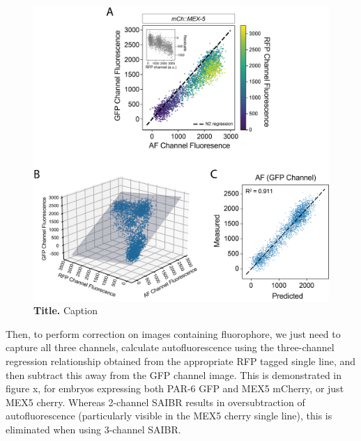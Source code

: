 \documentclass[12pt]{"article"}
\newcommand{\mycaption}[2]{\caption[#1]{\textbf{#1.} #2}}
\begin{document}
\begin{figure}[!h]
\includegraphics[scale=1]{saibr_3channel_correlation}
\setlength{\abovecaptionskip}{20pt}
\centering
\mycaption{Title}{Caption}
\end{figure}

Then, to perform correction on images containing fluorophore, we just need to capture all three channels, calculate autofluorescence using the three-channel regression relationship obtained from the appropriate RFP tagged single line, and then subtract this away from the GFP channel image. This is demonstrated in figure x, for embryos expressing both PAR-6 GFP and MEX5 mCherry, or just MEX5 cherry. Whereas 2-channel SAIBR results in oversubtraction of autofluorescence (particularly visible in the MEX5 cherry single line), this is eliminated when using 3-channel SAIBR.\\
\end{document}
